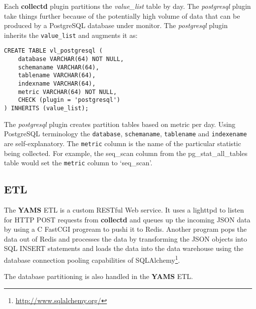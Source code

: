 \documentclass[a4paper,twoside,12pt]{article}
\begin{document}
Each \textbf{collectd} plugin partitions the \textit{value\_list} table by day.
The \textit{postgresql} plugin take things further because of the potentially
high volume of data that can be produced by a PostgreSQL database under
monitor.  The \textit{postgresql} plugin inherits the \texttt{value\_list} and
augments it as:

\lstset{language=sql}
\begin{lstlisting}
CREATE TABLE vl_postgresql (
    database VARCHAR(64) NOT NULL,
    schemaname VARCHAR(64),
    tablename VARCHAR(64),
    indexname VARCHAR(64),
    metric VARCHAR(64) NOT NULL,
    CHECK (plugin = 'postgresql')
) INHERITS (value_list);
\end{lstlisting}

The \textit{postgresql} plugin creates partition tables based on metric per
day.  Using PostgreSQL terminology the \texttt{database}, \texttt{schemaname},
\texttt{tablename} and \texttt{indexename} are self-explanatory.  The
\texttt{metric} column is the name of the particular statistic being collected.
For example, the seq\_scan column from the pg\_stat\_all\_tables table would
set the \texttt{metric} column to `seq\_scan'.

\subsection{ETL}

The \textbf{YAMS} ETL is a custom RESTful Web service.  It uses a lighttpd to
listen for HTTP POST requests from \textbf{collectd} and queues up the incoming
JSON data by using a C FastCGI progream to pushi it to Redis.  Another program
pops the data out of Redis and processes the data by transforming the JSON
objects into SQL INSERT statements and loads the data into the data warehouse
using the database connection pooling capabilities of
SQLAlchemy\footnote{\url{http://www.sqlalchemy.org/}}.

The database partitioning is also handled in the \textbf{YAMS} ETL.
\end{document}

